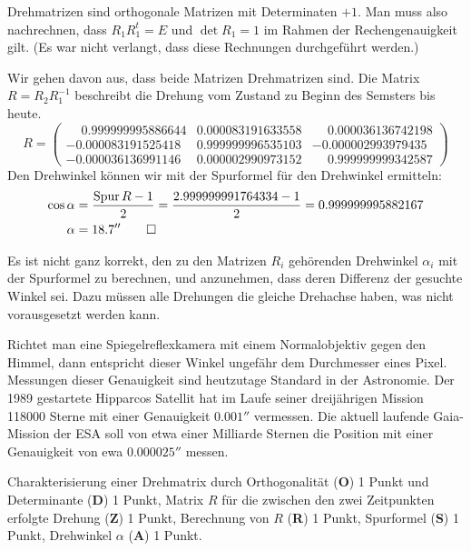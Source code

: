 \begin{loesung}
\begin{teilaufgaben}
\item
Drehmatrizen sind orthogonale Matrizen mit Determinaten $+1$.
Man muss also nachrechnen, dass $R_1R_1^t=E$ und $\det R_1=1$
im Rahmen der Rechengenauigkeit gilt. (Es war nicht verlangt,
dass diese Rechnungen durchgeführt werden.)
\item
Wir gehen davon aus, dass beide Matrizen Drehmatrizen sind.
Die Matrix $R=R_2R_1^{-1}$ beschreibt die Drehung vom Zustand zu Beginn
des Semsters bis heute.
\[
R = \begin{pmatrix}
\phantom{-}0.999999995886644& 0.000083191633558&\phantom{-}0.000036136742198\\
          -0.000083191525418& 0.999999996535103&          -0.000002993979435\\
          -0.000036136991146& 0.000002990973152&\phantom{-}0.999999999342587
\end{pmatrix}
\]
Den Drehwinkel können wir mit der Spurformel für den Drehwinkel ermitteln:
\begin{align*}
\cos\alpha
&=
\frac{\operatorname{Spur}R-1}2=\frac{2.999999991764334-1}2
=
0.999999995882167
\\
\alpha&=18.7''
\qedhere
\end{align*}
\end{teilaufgaben}
\end{loesung}

\begin{diskussion}
Es ist nicht ganz korrekt, den zu den Matrizen $R_i$ gehörenden Drehwinkel
$\alpha_i$ mit der Spurformel zu berechnen, und anzunehmen, dass deren
Differenz der gesuchte Winkel sei.
Dazu müssen alle Drehungen die gleiche Drehachse haben, was nicht
vorausgesetzt werden kann.

Richtet man eine Spiegelreflexkamera mit einem Normalobjektiv gegen den
Himmel, dann entspricht dieser Winkel ungefähr dem Durchmesser eines Pixel.
Messungen dieser Genauigkeit sind heutzutage Standard in der Astronomie.
Der 1989 gestartete Hipparcos Satellit hat im Laufe seiner dreijährigen
Mission 118000 Sterne mit einer Genauigkeit $0.001''$ vermessen.
Die aktuell laufende Gaia-Mission der ESA soll von etwa einer Milliarde
Sternen die Position mit einer Genauigkeit von ewa $0.000025''$ messen.
\end{diskussion}

\begin{bewertung}
Charakterisierung einer Drehmatrix durch Orthogonalität ({\bf O}) 1 Punkt
und Determinante ({\bf D}) 1 Punkt,
Matrix $R$ für die zwischen den zwei Zeitpunkten erfolgte Drehung ({\bf Z})
1 Punkt,
Berechnung von $R$ ({\bf R}) 1 Punkt,
Spurformel ({\bf S}) 1 Punkt,
Drehwinkel $\alpha$ ({\bf A}) 1 Punkt.
\end{bewertung}

